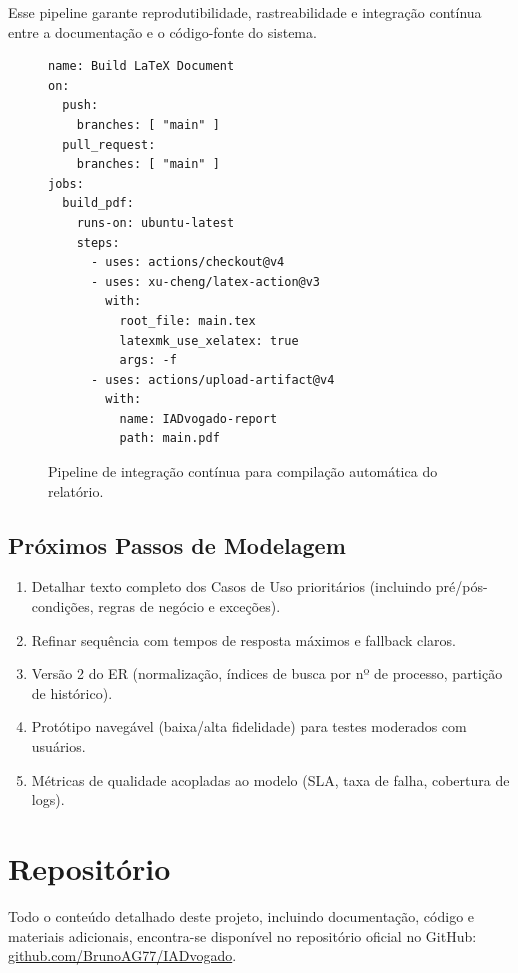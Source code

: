 \documentclass{article}
\begin{document}
Esse pipeline garante reprodutibilidade, rastreabilidade e integração contínua entre a documentação e o código-fonte do sistema.

\begin{figure}
\centering
\begin{verbatim}
name: Build LaTeX Document
on:
  push:
    branches: [ "main" ]
  pull_request:
    branches: [ "main" ]
jobs:
  build_pdf:
    runs-on: ubuntu-latest
    steps:
      - uses: actions/checkout@v4
      - uses: xu-cheng/latex-action@v3
        with:
          root_file: main.tex
          latexmk_use_xelatex: true
          args: -f
      - uses: actions/upload-artifact@v4
        with:
          name: IADvogado-report
          path: main.pdf
\end{verbatim}
\caption{Pipeline de integração contínua para compilação automática do relatório.}
\end{figure}


\newpage

\subsection{Próximos Passos de Modelagem}
\begin{enumerate}
    \item Detalhar texto completo dos Casos de Uso prioritários (incluindo pré/pós-condições, regras de negócio e exceções).
    \item Refinar sequência com tempos de resposta máximos e fallback claros.
    \item Versão 2 do ER (normalização, índices de busca por nº de processo, partição de histórico).
    \item Protótipo navegável (baixa/alta fidelidade) para testes moderados com usuários.
    \item Métricas de qualidade acopladas ao modelo (SLA, taxa de falha, cobertura de logs).
\end{enumerate}

\section{Repositório}
Todo o conteúdo detalhado deste projeto, incluindo documentação, código e materiais adicionais, encontra-se disponível no repositório oficial no GitHub: \href{https://github.com/BrunoAG77/IADvogado}{github.com/BrunoAG77/IADvogado}.
\end{document}
